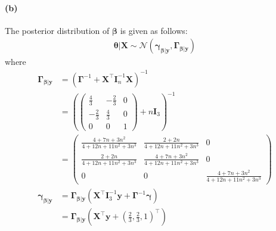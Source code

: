 \paragraph{(b)}
The posterior distribution of $\bm{\beta}$ is given as follows:
\begin{align*}
    \bm{\theta} \vert \bm{X} \sim \mathcal{N}(\bm{\gamma}_{\bm{\beta} \vert \bm{y}}, \bm{\Gamma}_{\bm{\beta} \vert \bm{y}})
\end{align*}
where
\begin{align*}
    \bm{\Gamma}_{\bm{\beta} \vert \bm{y}} 
    &= 
    (\bm{\Gamma}^{-1} + \bm{X}^{\top}\bm{I}_n^{-1}\bm{X})^{-1} \\
    &=
    \left(
    \begin{pmatrix}
        \frac{4}{3} & -\frac{2}{3} & 0\\
        -\frac{2}{3} & \frac{4}{3} & 0\\
        0 & 0 & 1
    \end{pmatrix} + n\bm{I}_3
    \right)^{-1}\\
    &=
    \begin{pmatrix}
        \frac{4+7n+3n^2}{4+12n+11n^2+3n^3} & \frac{2+2n}{4+12n+11n^2+3n^3} & 0\\
        \frac{2+2n}{4+12n+11n^2+3n^3} & \frac{4+7n+3n^2}{4+12n+11n^2+3n^3} & 0\\
        0 & 0 & \frac{4+7n+3n^2}{4+12n+11n^2+3n^3}
    \end{pmatrix}\\
    \bm{\gamma}_{\bm{\beta} \vert \bm{y}}
    &=\bm{\Gamma}_{\bm{\beta} \vert \bm{y}}(\bm{X}^{\top} \bm{I}_3^{-1} \bm{y} + \bm{\Gamma}^{-1}\bm{\gamma})\\
    &= \bm{\Gamma}_{\bm{\beta} \vert \bm{y}}  \left(
    \bm{X}^{\top}\bm{y} + \left( \frac{2}{3}, \frac{2}{3}, 1 \right)^{\top}
    \right)
\end{align*}